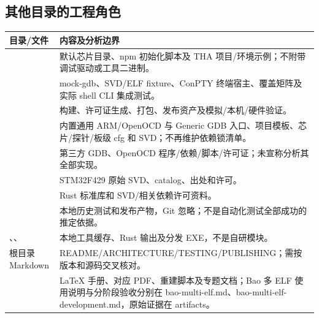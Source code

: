 \documentclass[UTF8,a4paper,11pt,oneside,fontset=none]{ctexart}
\begin{document}
\subsection{其他目录的工程角色}
\noindent\begin{tabularx}{\linewidth}{@{}P{38mm}Y@{}}\toprule
目录/文件 & 内容及分析边界\\\midrule
{} & 默认芯片目录、npm 初始化脚本及 THA 项目/环境示例；不附带调试驱动或工具二进制。\\
 & mock-gdb、SVD/ELF fixture、ConPTY 终端宿主、覆盖矩阵及实际 shell CLI 集成测试。\\
 & 构建、许可证生成、打包、发布资产及模拟/本机/硬件验证。\\
 & 内置通用 ARM/OpenOCD 与 Generic GDB 入口、项目模板、芯片/探针/板级 cfg 和 SVD；不再维护依赖锁清单。\\
 & 第三方 GDB、OpenOCD 程序/依赖/脚本/许可证；未宣称分析其全部实现。\\
 & STM32F429 原始 SVD、catalog、出处和许可。\\
 & Rust 标准库和 SVD/相关依赖许可资料。\\
 & 本地历史测试和发布产物，Git 忽略；不是自动化测试全部成功的推定依据。\\
、、 & 本地工具缓存、Rust 输出及分发 EXE，不是自研模块。\\
根目录 Markdown & README/ARCHITECTURE/TESTING/PUBLISHING；需按版本和源码交叉核对。\\
 & LaTeX 手册、对应 PDF、重建脚本及专题文档；Bao 多 ELF 使用说明与分阶段验收分别在 bao-multi-elf.md、bao-multi-elf-development.md，原始证据在 artifacts。\\\bottomrule
\end{tabularx}
\end{document}
